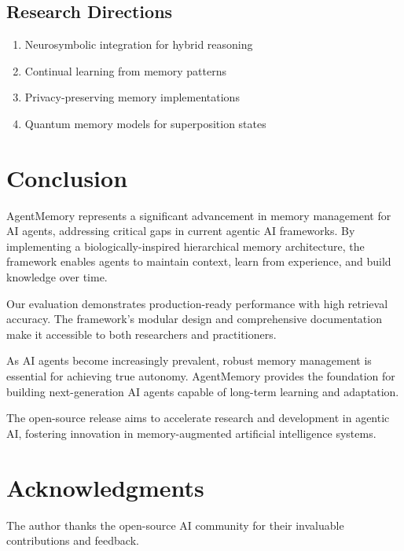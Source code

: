 \documentclass[journal]{IEEEtran}
\begin{document}
\subsection{Research Directions}
\begin{enumerate}
\item Neurosymbolic integration for hybrid reasoning
\item Continual learning from memory patterns
\item Privacy-preserving memory implementations
\item Quantum memory models for superposition states
\end{enumerate}

\section{Conclusion}

AgentMemory represents a significant advancement in memory management for AI agents, addressing critical gaps in current agentic AI frameworks. By implementing a biologically-inspired hierarchical memory architecture, the framework enables agents to maintain context, learn from experience, and build knowledge over time.

Our evaluation demonstrates production-ready performance with high retrieval accuracy. The framework's modular design and comprehensive documentation make it accessible to both researchers and practitioners.

As AI agents become increasingly prevalent, robust memory management is essential for achieving true autonomy. AgentMemory provides the foundation for building next-generation AI agents capable of long-term learning and adaptation.

The open-source release aims to accelerate research and development in agentic AI, fostering innovation in memory-augmented artificial intelligence systems.

\section*{Acknowledgments}

The author thanks the open-source AI community for their invaluable contributions and feedback.
\end{document}
